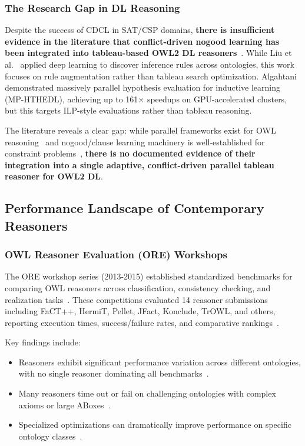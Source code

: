 \documentclass[preprint,12pt]{elsarticle}
\begin{document}
\subsubsection{The Research Gap in DL Reasoning}

Despite the success of CDCL in SAT/CSP domains, \textbf{there is insufficient evidence in the literature that conflict-driven nogood learning has been integrated into tableau-based OWL2 DL reasoners}~\cite{glorian2020nacre}. While Liu et al.~\cite{liu2019deep} applied deep learning to discover inference rules across ontologies, this work focuses on rule augmentation rather than tableau search optimization. Algahtani~\cite{algahtani2024mp} demonstrated massively parallel hypothesis evaluation for inductive learning (MP-HTHEDL), achieving up to 161$\times$ speedups on GPU-accelerated clusters, but this targets ILP-style evaluations rather than tableau reasoning.

The literature reveals a clear gap: while parallel frameworks exist for OWL reasoning~\cite{quan2017parallel,quan2019framework,liu2017spowl,gu2015cichlid} and nogood/clause learning machinery is well-established for constraint problems~\cite{glorian2020nacre}, \textbf{there is no documented evidence of their integration into a single adaptive, conflict-driven parallel tableau reasoner for OWL2 DL}.

\subsection{Performance Landscape of Contemporary Reasoners}

\subsubsection{OWL Reasoner Evaluation (ORE) Workshops}

The ORE workshop series (2013-2015) established standardized benchmarks for comparing OWL reasoners across classification, consistency checking, and realization tasks~\cite{parsia2015ore,scioscia2021ore}. These competitions evaluated 14 reasoner submissions including FaCT++, HermiT, Pellet, JFact, Konclude, TrOWL, and others, reporting execution times, success/failure rates, and comparative rankings~\cite{parsia2015ore,scioscia2021ore}.

Key findings include:
\begin{itemize}
    \item Reasoners exhibit significant performance variation across different ontologies, with no single reasoner dominating all benchmarks~\cite{kang2012rigorous}.
    \item Many reasoners time out or fail on challenging ontologies with complex axioms or large ABoxes~\cite{parsia2015ore,scioscia2021ore}.
    \item Specialized optimizations can dramatically improve performance on specific ontology classes~\cite{song2013complete,glimm2014coupling}.
\end{itemize}
\end{document}
